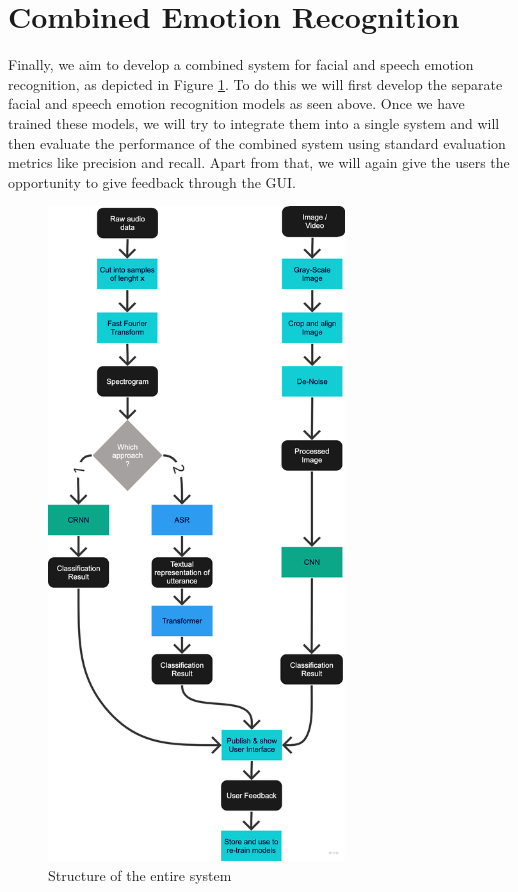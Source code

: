 \newpage
\section{Combined Emotion Recognition}
Finally, we aim to develop a combined system for facial and speech emotion recognition, as depicted in Figure \ref{fig:whole-system}. To do this we will first develop the separate facial and speech emotion recognition models as seen above. Once we have trained these models, we will try to integrate them into a single system and will then evaluate the performance of the combined system using standard evaluation metrics like precision and recall. Apart from that, we will again give the users the opportunity to give feedback through the GUI. 
\begin{figure}[h]
\centering
\includegraphics[width=0.7\textwidth]{images/whole-system.png}
\caption{Structure of the entire system}\label{fig:whole-system}
\end{figure}